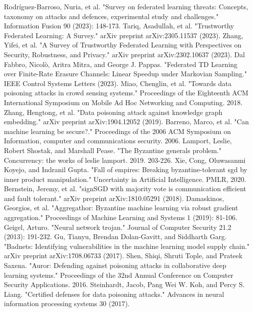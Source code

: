 \documentclass[conference]{IEEEtran}
\begin{document}
\begin{thebibliography}{00}
     Rodríguez-Barroso, Nuria, et al. "Survey on federated learning threats: Concepts, taxonomy on attacks and defences, experimental study and challenges." Information Fusion 90 (2023): 148-173.
     Tariq, Asadullah, et al. "Trustworthy Federated Learning: A Survey." arXiv preprint arXiv:2305.11537 (2023).
     Zhang, Yifei, et al. "A Survey of Trustworthy Federated Learning with Perspectives on Security, Robustness, and Privacy." arXiv preprint arXiv:2302.10637 (2023).
     Dal Fabbro, Nicolò, Aritra Mitra, and George J. Pappas. "Federated TD Learning over Finite-Rate Erasure Channels: Linear Speedup under Markovian Sampling." IEEE Control Systems Letters (2023).
     Miao, Chenglin, et al. "Towards data poisoning attacks in crowd sensing systems." Proceedings of the Eighteenth ACM International Symposium on Mobile Ad Hoc Networking and Computing. 2018.
     Zhang, Hengtong, et al. "Data poisoning attack against knowledge graph embedding." arXiv preprint arXiv:1904.12052 (2019).
     Barreno, Marco, et al. "Can machine learning be secure?." Proceedings of the 2006 ACM Symposium on Information, computer and communications security. 2006.
     Lamport, Leslie, Robert Shostak, and Marshall Pease. "The Byzantine generals problem." Concurrency: the works of leslie lamport. 2019. 203-226.
     Xie, Cong, Oluwasanmi Koyejo, and Indranil Gupta. "Fall of empires: Breaking byzantine-tolerant sgd by inner product manipulation." Uncertainty in Artificial Intelligence. PMLR, 2020.
     Bernstein, Jeremy, et al. "signSGD with majority vote is communication efficient and fault tolerant." arXiv preprint arXiv:1810.05291 (2018).
     Damaskinos, Georgios, et al. "Aggregathor: Byzantine machine learning via robust gradient aggregation." Proceedings of Machine Learning and Systems 1 (2019): 81-106.
     Geigel, Arturo. "Neural network trojan." Journal of Computer Security 21.2 (2013): 191-232.
     Gu, Tianyu, Brendan Dolan-Gavitt, and Siddharth Garg. "Badnets: Identifying vulnerabilities in the machine learning model supply chain." arXiv preprint arXiv:1708.06733 (2017).
     Shen, Shiqi, Shruti Tople, and Prateek Saxena. "Auror: Defending against poisoning attacks in collaborative deep learning systems." Proceedings of the 32nd Annual Conference on Computer Security Applications. 2016.
     Steinhardt, Jacob, Pang Wei W. Koh, and Percy S. Liang. "Certified defenses for data poisoning attacks." Advances in neural information processing systems 30 (2017).

\end{thebibliography}
\end{document}
